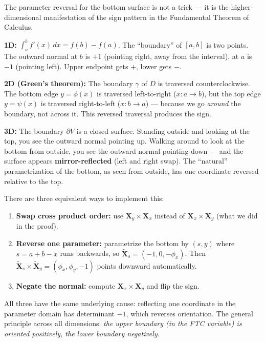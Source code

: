 \documentclass[11pt]{report}
\begin{document}
\begin{remark}
The parameter reversal for the bottom surface is not a trick --- it is the higher-dimensional manifestation of the sign pattern in the Fundamental Theorem of Calculus.

\textbf{1D:} $\int_a^b f'(x)\,dx = f(b) - f(a)$. The ``boundary'' of $[a,b]$ is two points. The outward normal at $b$ is $+1$ (pointing right, away from the interval), at $a$ is $-1$ (pointing left). Upper endpoint gets $+$, lower gets $-$.

\textbf{2D (Green's theorem):} The boundary $\gamma$ of $D$ is traversed counterclockwise. The bottom edge $y = \phi(x)$ is traversed left-to-right ($x: a \to b$), but the top edge $y = \psi(x)$ is traversed right-to-left ($x: b \to a$) --- because we go \textit{around} the boundary, not across it. This reversed traversal produces the sign.

\textbf{3D:} The boundary $\partial V$ is a closed surface. Standing outside and looking at the top, you see the outward normal pointing up. Walking around to look at the bottom from outside, you see the outward normal pointing down --- and the surface appears \textbf{mirror-reflected} (left and right swap). The ``natural'' parametrization of the bottom, as seen from outside, has one coordinate reversed relative to the top.

There are three equivalent ways to implement this:
\begin{enumerate}
    \item \textbf{Swap cross product order:} use $\mathbf{X}_y \times \mathbf{X}_x$ instead of $\mathbf{X}_x \times \mathbf{X}_y$ (what we did in the proof).
    \item \textbf{Reverse one parameter:} parametrize the bottom by $(s, y)$ where $s = a + b - x$ runs backwards, so $\tilde{\mathbf{X}}_s = (-1, 0, -\phi_x)$. Then $\tilde{\mathbf{X}}_s \times \tilde{\mathbf{X}}_y = (\phi_x, \phi_y, -1)$ points downward automatically.
    \item \textbf{Negate the normal:} compute $\mathbf{X}_x \times \mathbf{X}_y$ and flip the sign.
\end{enumerate}

All three have the same underlying cause: reflecting one coordinate in the parameter domain has determinant $-1$, which reverses orientation. The general principle across all dimensions: \textit{the upper boundary (in the FTC variable) is oriented positively, the lower boundary negatively}.
\end{remark}
\end{document}
